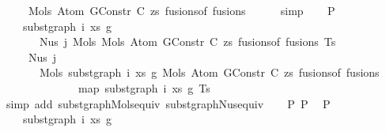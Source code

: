 \begin{isabellebody}
\ \ \ \ \ Mols{}\ {\isacharparenleft}{\kern0pt}Atom\ {\isacharparenleft}{\kern0pt}GConstr\ C{\isacharparenright}{\kern0pt}\ zs{\isacharparenright}{\kern0pt}\ {\isacharparenleft}{\kern0pt}fusions{\isacharunderscore}{\kern0pt}of\ fusions{\isacharparenright}{\kern0pt}{\isachardoublequoteclose}\isanewline
\ \ \ \ \isamarkupfalse%
\ simp\isanewline
\isanewline
\isanewline
\ \ \isamarkupfalse%
\ P{}{\isacharcolon}{\kern0pt}\isanewline
\ \ \ \ {\isachardoublequoteopen}subst{\isacharunderscore}{\kern0pt}graph\ i\ xs\ g{}\isanewline
\ \ \ \ \ \ \ {\isacharparenleft}{\kern0pt}Nus{}\ j\ {\isacharparenleft}{\kern0pt}Mols{}\ {\isacharparenleft}{\kern0pt}Mols{}\ {\isacharparenleft}{\kern0pt}Atom\ {\isacharparenleft}{\kern0pt}GConstr\ C{\isacharparenright}{\kern0pt}\ zs{\isacharparenright}{\kern0pt}\ {\isacharparenleft}{\kern0pt}fusions{\isacharunderscore}{\kern0pt}of\ fusions{\isacharparenright}{\kern0pt}{\isacharparenright}{\kern0pt}\ Ts{\isacharparenright}{\kern0pt}{\isacharparenright}{\kern0pt}\ {\isacharequal}{\kern0pt}\isanewline
\ \ \ \ \ Nus{}\ j\isanewline
\ \ \ \ \ \ \ {\isacharparenleft}{\kern0pt}Mols{}\ {\isacharparenleft}{\kern0pt}subst{\isacharunderscore}{\kern0pt}graph\ i\ xs\ g{}\ {\isacharparenleft}{\kern0pt}Mols{}\ {\isacharparenleft}{\kern0pt}Atom\ {\isacharparenleft}{\kern0pt}GConstr\ C{\isacharparenright}{\kern0pt}\ zs{\isacharparenright}{\kern0pt}\ {\isacharparenleft}{\kern0pt}fusions{\isacharunderscore}{\kern0pt}of\ fusions{\isacharparenright}{\kern0pt}{\isacharparenright}{\kern0pt}{\isacharparenright}{\kern0pt}\isanewline
\ \ \ \ \ \ \ \ \ \ \ \ \ \ {\isacharparenleft}{\kern0pt}map\ {\isacharparenleft}{\kern0pt}subst{\isacharunderscore}{\kern0pt}graph\ i\ xs\ g{}{\isacharparenright}{\kern0pt}\ Ts{\isacharparenright}{\kern0pt}{\isacharparenright}{\kern0pt}{\isachardoublequoteclose}\isanewline
\ \ \ \ \isamarkupfalse%
\ {\isacharparenleft}{\kern0pt}simp\ add{\isacharcolon}{\kern0pt}\ subst{\isacharunderscore}{\kern0pt}graph{\isacharunderscore}{\kern0pt}Mols{}{\isacharunderscore}{\kern0pt}equiv\ subst{\isacharunderscore}{\kern0pt}graph{\isacharunderscore}{\kern0pt}Nus{}{\isacharunderscore}{\kern0pt}equiv{\isacharparenright}{\kern0pt}\isanewline
\isanewline
\isanewline
\ \ \isamarkupfalse%
\ P{}\ P{}\ \isamarkupfalse%
\ P{}{\isacharcolon}{\kern0pt}\isanewline
\ \ \ \ {\isachardoublequoteopen}subst{\isacharunderscore}{\kern0pt}graph\ i\ xs\ g{}\isanewline

\end{isabellebody}
